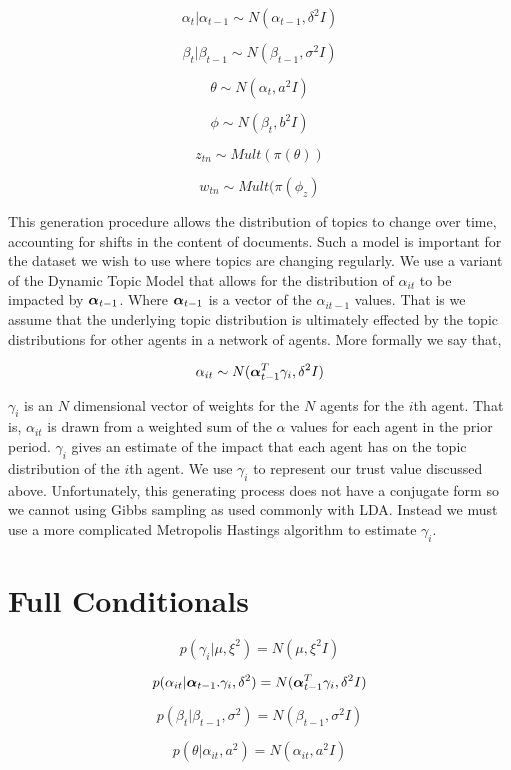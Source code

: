 \documentclass[a4paper]{article}
\begin{document}
\[\alpha_t | \alpha_{t-1} \sim N(\alpha_{t-1}, \delta^2I)\]

\[\beta_t | \beta_{t-1} \sim N(\beta_{t-1}, \sigma^2I)\]

\[\theta \sim N(\alpha_t, a^2I)\]

\[\phi \sim N(\beta_t, b^2I)\]

\[z_{tn} \sim Mult(\pi(\theta))\]

\[w_{tn} \sim Mult(\pi(\phi_z)\]

This generation procedure allows the distribution of topics to change over time, accounting for shifts in the content of documents.  Such a model is important for the dataset we wish to use where topics are changing regularly.  We use a variant of the Dynamic Topic Model that allows for the distribution of $\alpha_{it}$ to be impacted by $\text{\boldmath$\alpha$}_{t-1}$.  Where $\text{\boldmath$\alpha$}_{t-1}$ is a vector of the $\alpha_{it-1}$ values.  That is we assume that the underlying topic distribution is ultimately effected by the topic distributions for other agents in a network of agents.  More formally we say that,

\[\alpha_{it} \sim N(\text{\boldmath$\alpha$}_{t-1}^T \gamma_i, \delta^2I)\]

$\gamma_i$ is an $N$ dimensional vector of weights for the $N$ agents for the $i$th agent.  That is, $\alpha_{it}$ is drawn from a weighted sum of the $\alpha$ values for each agent in the prior period.  $\gamma_i$ gives an estimate of the impact that each agent has on the topic distribution of the $i$th agent.  We use $\gamma_i$ to represent our trust value discussed above.  Unfortunately, this generating process does not have a conjugate form so we cannot using Gibbs sampling as used commonly with LDA.  Instead we must use a more complicated Metropolis Hastings algorithm to estimate $\gamma_i$.

\newpage
\appendix

\section{Full Conditionals}

\[p(\gamma_i | \mu, \xi^2) = N(\mu, \xi^2I)\]

\[p(\alpha_{it} | \text{\boldmath$\alpha$}_{t-1}. \gamma_i, \delta^2) = N(\text{\boldmath$\alpha$}^T_{t-1} \gamma_i, \delta^2I)\]

\[p(\beta_t | \beta_{t-1}, \sigma^2) = N(\beta_{t-1}, \sigma^2I)\]

\[p(\theta | \alpha_{it}, a^2) = N(\alpha_{it}, a^2I)\] 
\end{document}
